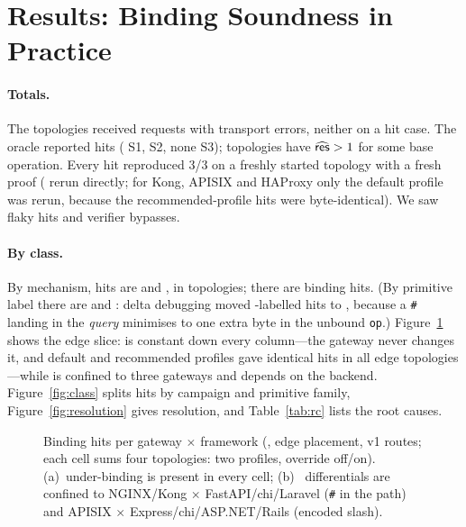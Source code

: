 \section{Results: Binding Soundness in Practice}\label{sec:results}

\paragraph{Totals.} The \NumTopologies{} \Aleak topologies received
\NumCases{} requests with \NumTransportErrors{} transport errors, neither on a
hit case. The oracle reported \NumHits{} hits (\NumSOneHits{} S1,
\NumSTwoHits{} S2, none S3); \NumVulnTopologies{} topologies have
$\widehat{\mathsf{res}}>1$ for some base operation. Every hit reproduced 3/3 on a
freshly started topology with a fresh proof (\NumConfirmedHits{} rerun
directly; for Kong, APISIX and HAProxy only the default profile was rerun,
because the recommended-profile hits were byte-identical). We saw
\NumFlaky{} flaky hits and \NumBZero{} verifier bypasses.

\paragraph{By class.} By mechanism, \NumHitsGOne{} hits are \GA and
\NumHitsGTwo{} \GB, in \NumGTwoTopologies{} topologies; there are
\NumHitsGThree{} \GC binding hits. (By primitive label there are
\NumHitsGOneOracle{} and \NumHitsGTwoOracle{}: delta debugging moved
\NumHitsRCSeven{} \GB-labelled hits to \GA, because a \texttt{\#} landing in
the \emph{query} minimises to one extra byte in the unbound \texttt{op}.)
Figure~\ref{fig:heatmap} shows the edge slice: \GA is constant down every
column---the gateway never changes it, and default and recommended profiles
gave identical hits in all \NumTopoVOneEdge{} edge topologies---while \GB is
confined to three gateways and depends on the backend.
Figure~\ref{fig:class} splits hits by campaign and primitive family,
Figure~\ref{fig:resolution} gives resolution, and Table~\ref{tab:rc} lists the
root causes.

\begin{figure}[t]
\centering
{}
\caption{Binding hits per gateway $\times$ framework (\Aleak, edge
placement, v1 routes; each cell sums four topologies: two profiles, override
off/on). (a)~\GA under-binding is present in every cell; (b)~\GB
differentials are confined to NGINX/Kong $\times$ FastAPI/chi/Laravel
(\texttt{\#} in the path) and APISIX $\times$ Express/chi/ASP.NET/Rails
(encoded slash).}
\label{fig:heatmap}
\end{figure}

